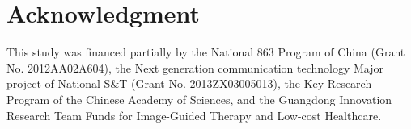 \documentclass[journal]{IEEEtran}
\begin{document}
\section*{Acknowledgment}
This study was financed partially by the National 863 Program of China (Grant No. 2012AA02A604), the Next generation communication technology Major project of National S\&T (Grant No. 2013ZX03005013), the Key Research Program of the Chinese Academy of Sciences, and the Guangdong Innovation Research Team Funds for Image-Guided Therapy and Low-cost Healthcare. 
\ifCLASSOPTIONcaptionsoff
  \newpage
\fi



%
%
%
  

  
  

% 
\end{document}
